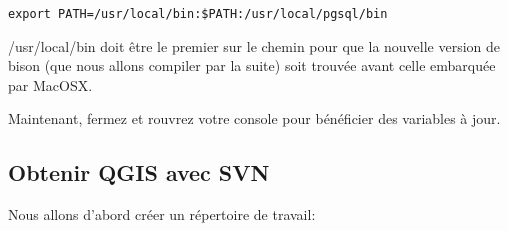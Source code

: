 \begin{verbatim}
export PATH=/usr/local/bin:$PATH:/usr/local/pgsql/bin 
\end{verbatim}

/usr/local/bin doit être le premier sur le chemin pour que la nouvelle version de bison (que nous allons compiler par la suite) soit trouvée avant celle embarquée par MacOSX.

Maintenant, fermez et rouvrez votre console pour bénéficier des variables à jour.

% 
% 
% 
% 
% 
% 
% 
% 
% 
% 
% 

\subsection{Obtenir QGIS avec SVN}
Nous allons d'abord créer un répertoire de travail:

